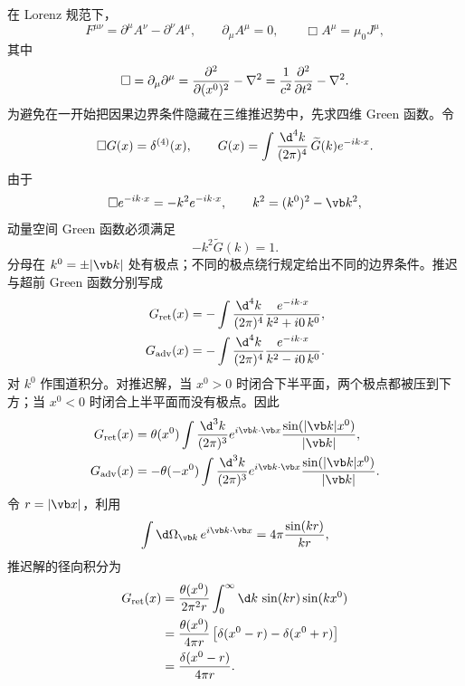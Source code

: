 在 Lorenz 规范下，
\begin{equation}
 F^{\mu\nu}=\partial^\mu A^\nu-\partial^\nu A^\mu,
 \qquad
 \partial_\mu A^\mu=0,
 \qquad
 \Box A^\mu=\mu_0J^\mu,
 \label{eq:dirac-detail-wave-equation}
\end{equation}
其中
\begin{equation*}
 \Box=\partial_\mu\partial^\mu
 ={\partial^2\over\partial(x^0)^2}-\nabla^2
 ={1\over c^2}{\partial^2\over\partial t^2}-\nabla^2.
\end{equation*}
为避免在一开始把因果边界条件隐藏在三维推迟势中，先求四维 Green 函数。令
\begin{equation}
 \Box G(x)=\delta^{(4)}(x),
 \qquad
 G(x)=\int{\d^4k\over(2\pi)^4}\,\widetilde G(k)e^{-ik\cdot x}.
 \label{eq:dirac-detail-green-definition}
\end{equation}
由于
\begin{equation*}
 \Box e^{-ik\cdot x}=-k^2e^{-ik\cdot x},
 \qquad
 k^2=(k^0)^2-\vb k^2,
\end{equation*}
动量空间 Green 函数必须满足
\begin{equation*}
 -k^2\widetilde G(k)=1.
\end{equation*}
分母在 $k^0=\pm|\vb k|$ 处有极点；不同的极点绕行规定给出不同的边界条件。推迟与超前 Green 函数分别写成
\begin{align}
 G_{\mathrm{ret}}(x)
 &=-\int{\d^4k\over(2\pi)^4}
 {e^{-ik\cdot x}\over k^2+i0\,k^0},
 \notag\\
 G_{\mathrm{adv}}(x)
 &=-\int{\d^4k\over(2\pi)^4}
 {e^{-ik\cdot x}\over k^2-i0\,k^0}.
 \label{eq:dirac-detail-green-fourier}
\end{align}
对 $k^0$ 作围道积分。对推迟解，当 $x^0>0$ 时闭合下半平面，两个极点都被压到下方；当 $x^0<0$ 时闭合上半平面而没有极点。因此
\begin{align}
 G_{\mathrm{ret}}(x)
 &=\theta(x^0)
 \int{\d^3k\over(2\pi)^3}
 e^{i\vb k\cdot\vb x}
 {\sin(|\vb k|x^0)\over|\vb k|},
 \notag\\
 G_{\mathrm{adv}}(x)
 &=-\theta(-x^0)
 \int{\d^3k\over(2\pi)^3}
 e^{i\vb k\cdot\vb x}
 {\sin(|\vb k|x^0)\over|\vb k|}.
 \label{eq:dirac-detail-green-after-k0}
\end{align}
令 $r=|\vb x|$，利用
\begin{equation*}
 \int\d\Omega_{\vb k}\,e^{i\vb k\cdot\vb x}
 =4\pi{\sin(kr)\over kr},
\end{equation*}
推迟解的径向积分为
\begin{align}
 G_{\mathrm{ret}}(x)
 &= {\theta(x^0)\over2\pi^2r}
 \int_0^\infty\d k\,\sin(kr)\sin(kx^0)
 \notag\\
 &= {\theta(x^0)\over4\pi r}
 \left[\delta(x^0-r)-\delta(x^0+r)\right]
 \notag\\
 &= {\delta(x^0-r)\over4\pi r}.
 \label{eq:dirac-detail-green-retarded-delta}
\end{align}
